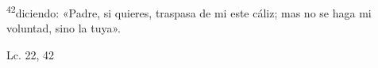 \documentclass[../../rosario.tex]{subfiles}
\begin{document}
    \textsuperscript{42}diciendo: «Padre, si quieres, traspasa de mi este cáliz; mas no se haga mi voluntad, sino la tuya».
    \begin{flushright}
    Lc. 22, 42
    \end{flushright}
\end{document}
